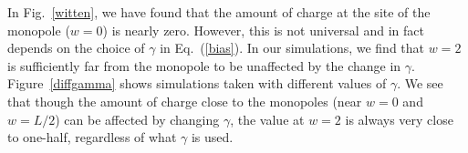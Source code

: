 \documentclass[prb,twocolumn]{revtex4-1}
\newcommand{\scripty}[1]{w}
\begin{document}
In Fig.~\ref{witten}, we have found that the amount of charge at the site of the monopole ($\scripty{r}=0$) is nearly zero. However, this is not universal and in fact depends on the choice of $\gamma$ in Eq.~(\ref{bias}). 
In our simulations, we find that $\scripty{r}=2$ is sufficiently far from the monopole to be unaffected by the change in $\gamma$. Figure~\ref{diffgamma} shows simulations taken with different values of $\gamma$. We see that though the amount of charge close to the monopoles (near $\scripty{r}=0$ and $\scripty{r}=L/2$) can be affected by changing $\gamma$, the value at $\scripty{r}=2$ is always very close to one-half, regardless of what $\gamma$ is used.
\end{document}
